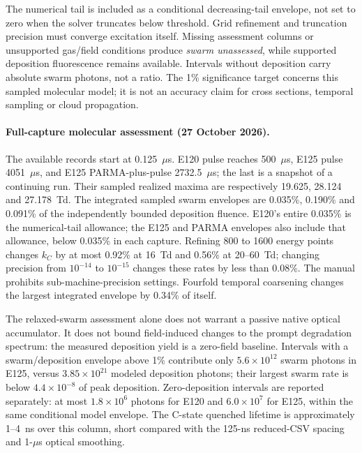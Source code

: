 \documentclass[11pt]{article}
\begin{document}
The numerical tail is included as a conditional decreasing-tail envelope,
not set to zero when the solver truncates below threshold. Grid refinement
and truncation precision must converge excitation itself. Missing assessment
columns or unsupported gas/field conditions produce \emph{swarm unassessed},
while supported deposition fluorescence remains available. Intervals without
deposition carry absolute swarm photons, not a ratio. The 1\% significance
target concerns this sampled molecular model; it is not an accuracy claim
for cross sections, temporal sampling or cloud propagation.

\paragraph{Full-capture molecular assessment (27 October 2026).}
The available records start at 0.125~$\mu$s. E120 pulse reaches 500~$\mu$s,
E125 pulse 4051~$\mu$s, and E125 PARMA-plus-pulse 2732.5~$\mu$s; the last
is a snapshot of a continuing run. Their sampled realized maxima are respectively
19.625, 28.124 and 27.178~Td. The integrated sampled swarm envelopes
are 0.035\%, 0.190\% and 0.091\% of the independently bounded deposition
fluence. E120's entire 0.035\% is the numerical-tail allowance; the E125 and
PARMA envelopes also include that allowance, below 0.035\% in each capture.
Refining 800 to 1600 energy points changes $k_C$ by at most
0.92\% at 16~Td and 0.56\% at 20--60~Td; changing precision from
$10^{-14}$ to $10^{-15}$ changes these rates by less than 0.08\%.
The manual prohibits sub-machine-precision settings. Fourfold temporal
coarsening changes the largest integrated envelope by 0.34\% of itself.

The relaxed-swarm assessment alone does not warrant a passive native
optical accumulator. It does not bound field-induced changes to the
prompt degradation spectrum: the measured deposition yield is a zero-field
baseline. Intervals with a swarm/deposition envelope above 1\% contribute
only $5.6\times10^{12}$ swarm photons in E125, versus
$3.85\times10^{21}$ modeled deposition photons; their largest swarm rate is
below $4.4\times10^{-8}$ of peak deposition. Zero-deposition intervals are
reported separately: at most $1.8\times10^6$ photons for E120 and
$6.0\times10^7$ for E125, within the same conditional model envelope.
The C-state quenched lifetime is approximately 1--4~ns over this column,
short compared with the 125-ns reduced-CSV spacing and 1-$\mu$s optical smoothing.
\end{document}
